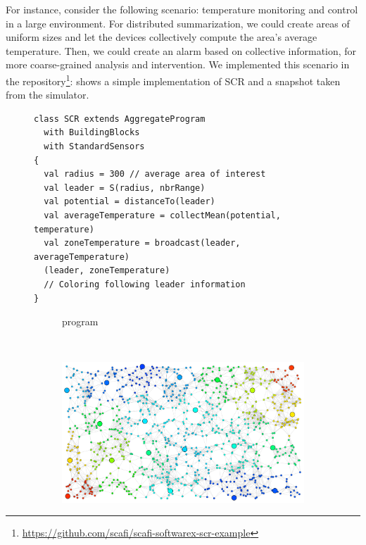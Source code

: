 For instance, consider the following scenario: 
 temperature monitoring and control in a large environment. 
%
For distributed summarization, 
 we could create areas of uniform sizes 
 and let 
 the devices collectively compute the area's average temperature. 
%
Then, we could create an alarm based on collective information, 
 for more coarse-grained analysis and intervention. %
%
We implemented this scenario in the repository\footnote{\url{https://github.com/scafi/scafi-softwarex-scr-example}}: 
  shows a simple \scafi{} implementation of SCR 
 and a snapshot taken from %
 the \scafi{} simulator.

 \begin{figure}
  \centering
  \newsavebox{\scrprogram}
  \begin{lrbox}{\scrprogram}%
  \begin{lstlisting}[deletekeywords={[2]{nbr}}]
class SCR extends AggregateProgram 
  with BuildingBlocks 
  with StandardSensors 
{
  val radius = 300 // average area of interest
  val leader = S(radius, nbrRange) 
  val potential = distanceTo(leader)
  val averageTemperature = collectMean(potential, temperature) 
  val zoneTemperature = broadcast(leader, averageTemperature)
  (leader, zoneTemperature)
  // Coloring following leader information
}
  \end{lstlisting}
  \end{lrbox}
  \begin{subfigure}{\textwidth}
    \usebox{\scrprogram}
    \caption{\label{fig:example-scr-code}\scafi{} program}
  \end{subfigure}\\
  \begin{subfigure}{\textwidth}
    \centering
    \includegraphics[width=0.8\linewidth]{papers/softwarex2021/imgs/scr-result.png}

\end{subfigure}
\end{figure}
